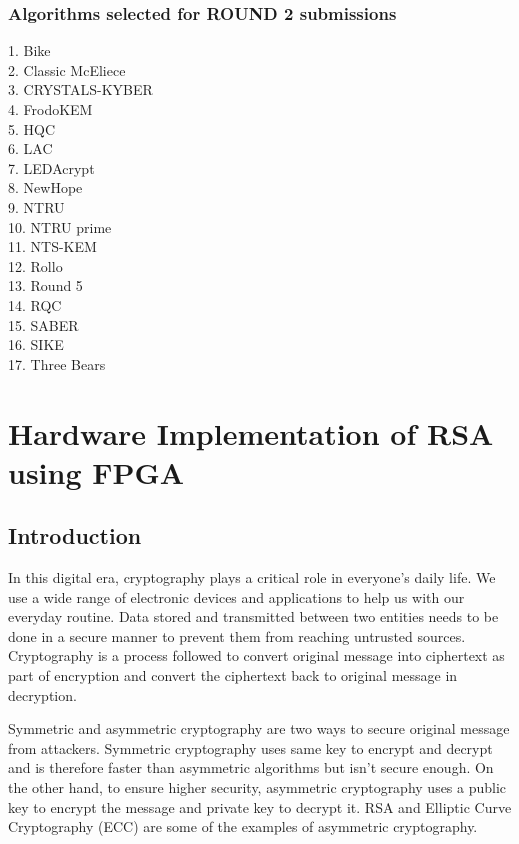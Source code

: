 \documentclass{cpp}
\begin{document}
\newpage
\subsection{Algorithms selected for ROUND 2 submissions}
1.	Bike \\
2.	Classic McEliece \\
3.	CRYSTALS-KYBER \\
4.	FrodoKEM \\
5.	HQC \\
6.	LAC \\
7.	LEDAcrypt \\
8.	NewHope \\
9.	NTRU \\
10.	NTRU prime \\
11.	NTS-KEM \\
12.	Rollo \\
13.	Round 5 \\
14.	RQC \\
15.	SABER \\ 
16.	SIKE \\
17.	Three Bears \\


\newpage

\chapter{Hardware Implementation of RSA using FPGA}

\section{Introduction}
%
In this digital era, cryptography plays a critical role in everyone’s daily life. We use a wide range of electronic devices and applications to help us with our everyday routine. Data stored and transmitted between two entities needs to be done in a secure manner to prevent them from reaching untrusted sources. Cryptography is a process followed to convert original message into ciphertext as part of encryption and convert the ciphertext back to original message in decryption.

Symmetric and asymmetric cryptography are two ways to secure original message from attackers. Symmetric cryptography uses same key to encrypt and decrypt and is therefore faster than asymmetric algorithms but isn’t secure enough. On the other
hand, to ensure higher security, asymmetric cryptography uses a public key to encrypt the message and private key to decrypt it. RSA and Elliptic Curve Cryptography (ECC) are some of the examples of asymmetric cryptography.
\end{document}
